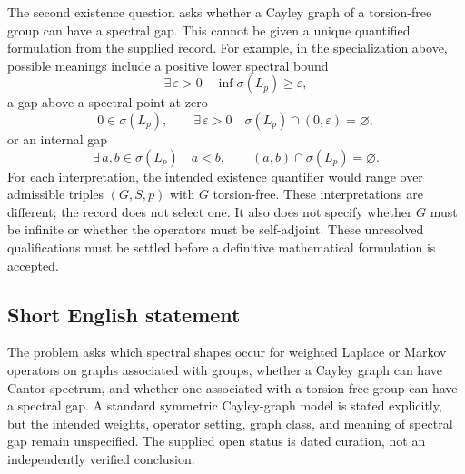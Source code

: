 \documentclass[11pt]{article}
\newcommand{\eps}{\varepsilon}
\begin{document}
The second existence question asks whether a Cayley graph of a torsion-free group can have a spectral gap. This cannot be given a unique quantified formulation from the supplied record. For example, in the specialization above, possible meanings include a positive lower spectral bound
\[
 \exists\,\eps>0\quad \inf\sigma(L_p)\geq\eps,
\]
 a gap above a spectral point at zero
\[
 0\in\sigma(L_p),\qquad
 \exists\,\eps>0\quad \sigma(L_p)\cap(0,\eps)=\varnothing,
\]
 or an internal gap
\[
 \exists\,a,b\in\sigma(L_p)\quad
 a<b,\qquad (a,b)\cap\sigma(L_p)=\varnothing.
\]
For each interpretation, the intended existence quantifier would range over admissible triples \((G,S,p)\) with \(G\) torsion-free. These interpretations are different; the record does not select one. It also does not specify whether \(G\) must be infinite or whether the operators must be self-adjoint. These unresolved qualifications must be settled before a definitive mathematical formulation is accepted.
\subsection{Short English statement}
The problem asks which spectral shapes occur for weighted Laplace or Markov operators on graphs associated with groups, whether a Cayley graph can have Cantor spectrum, and whether one associated with a torsion-free group can have a spectral gap. A standard symmetric Cayley-graph model is stated explicitly, but the intended weights, operator setting, graph class, and meaning of spectral gap remain unspecified. The supplied open status is dated curation, not an independently verified conclusion.
\end{document}
